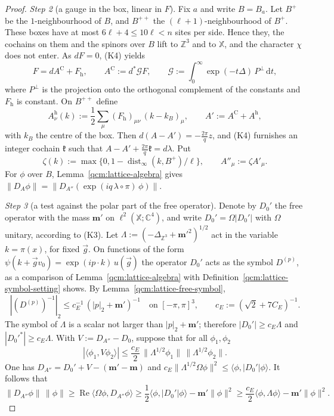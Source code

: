 \documentclass[11pt,letterpaper,reqno]{amsart}
\theoremstyle{definition}
\begin{document}
\begin{proof}
\emph{Step 2} (a gauge in the box, linear in $F$).
Fix $a$ and write $B=B_a$.
Let $B^+$ be the $1$-neighbourhood of $B$, and $B^{++}$ the $(\ell+1)$-neighbourhood of $B^+$.
These boxes have at most $6\ell+4\le10\ell<n$ sites per side.
Hence they, the cochains on them and the spinors over $B$ lift to $\mathbb Z^3$ and to $\mathbb X$, and the character $\chi$ does not enter.
As $dF=0$, (K4) yields
\begin{equation*}
F=dA^{\mathrm C}+F_{\mathrm h},\qquad A^{\mathrm C}:=d^*\mathcal GF,\qquad\mathcal G:=\int_0^\infty\exp(-t\Delta)\,P^\perp\,\mathrm dt,
\end{equation*}
where $P^\perp$ is the projection onto the orthogonal complement of the constants and $F_{\mathrm h}$ is constant.
On $B^{++}$ define
\begin{equation*}
A^{\mathrm h}_\nu(k):=\frac12\sum_\mu(F_{\mathrm h})_{\mu\nu}\,(k-k_B)_\mu,\qquad A':=A^{\mathrm C}+A^{\mathrm h},
\end{equation*}
with $k_B$ the centre of the box.
Then $d(A-A')=-\frac{2\pi}{q}z$, and (K4) furnishes an integer cochain $\mathfrak k$ such that $A-A'+\frac{2\pi}{q}\mathfrak k=d\lambda$.
Put
\begin{equation*}
\zeta(k):=\max\{0,1-\operatorname{dist}_\infty(k,B^+)/\ell\},\qquad A''_\mu:=\zeta A'_\mu.
\end{equation*}
For $\phi$ over $B$, Lemma~\ref{qcm:lattice-algebra} gives $\|D_A\phi\|=\|D_{A''}(\exp(iq\,\lambda\circ\pi)\,\phi)\|$.

\emph{Step 3} (a test against the polar part of the free operator).
Denote by $D_0'$ the free operator with the mass $\mathbf m'$ on $\ell^2(\mathbb X;\mathbb C^4)$, and write $D_0'=\Omega|D_0'|$ with $\Omega$ unitary, according to (K3).
Let $\Lambda:=(-\Delta_{\mathbb Z^3}+\mathbf m'^2)^{1/2}$ act in the variable $k=\pi(x)$, for fixed $\vec g$.
On functions of the form $\psi(k+\vec gv_0)=\exp(ip\cdot k)\,u(\vec g)$ the operator $D_0'$ acts as the symbol $D^{(p)}$, as a comparison of Lemma~\ref{qcm:lattice-algebra} with Definition~\ref{qcm:lattice-symbol-setting} shows.
By Lemma~\ref{qcm:lattice-free-symbol},
\begin{equation*}
|(D^{(p)})^{-1}|_2\le c_E^{-1}\,(|p|_2+\mathbf m')^{-1}\quad\text{on }[-\pi,\pi]^3,\qquad c_E:=(\sqrt2+7C_E)^{-1}.
\end{equation*}
The symbol of $\Lambda$ is a scalar not larger than $|p|_2+\mathbf m'$; therefore $|D_0'|\ge c_E\Lambda$ and $|D_0'^*|\ge c_E\Lambda$.
With $V:=D_{A''}-D_0$, suppose that for all $\phi_1,\phi_2$
\begin{equation}
\tag{5.1}\label{eq:polar-form-bound}
|\langle\phi_1,V\phi_2\rangle|\le\frac{c_E}{2}\,\|\Lambda^{1/2}\phi_1\|\,\|\Lambda^{1/2}\phi_2\|.
\end{equation}
One has $D_{A''}=D_0'+V-(\mathbf m'-\mathbf m)$ and $c_E\|\Lambda^{1/2}\Omega\phi\|^2\le\langle\phi,|D_0'|\phi\rangle$.
It follows that
\begin{equation*}
\|D_{A''}\phi\|\,\|\phi\|\ge\operatorname{Re}\langle\Omega\phi,D_{A''}\phi\rangle\ge\frac12\langle\phi,|D_0'|\phi\rangle-\mathbf m'\|\phi\|^2\ge\frac{c_E}{2}\langle\phi,\Lambda\phi\rangle-\mathbf m'\|\phi\|^2.
\end{equation*}


\end{proof}
\end{document}
